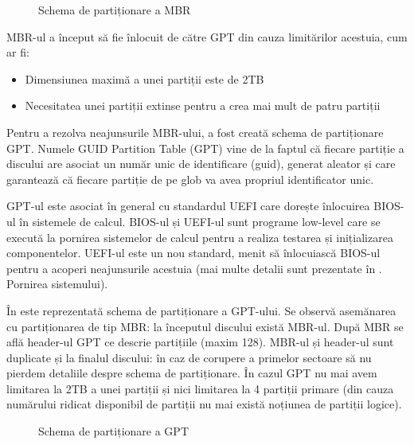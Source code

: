 \begin{figure}[htbp]
	\centering
	\def\svgwidth{\columnwidth}
	
	\caption{Schema de partiționare a MBR}
	\label{fig:storage-mbr-struct}
\end{figure}

MBR-ul a început să fie înlocuit de către GPT din cauza limitărilor acestuia,
cum ar fi:

\begin{itemize}
	\item Dimensiunea maximă a unei partiții este de 2TB
	\item Necesitatea unei partiții extinse pentru a crea mai mult de patru partiții
\end{itemize}

Pentru a rezolva neajunsurile MBR-ului, a fost creată schema de partiționare
GPT. Numele GUID Partition Table (GPT) vine de la faptul că fiecare partiție a
discului are asociat un număr unic de identificare (guid), generat aleator și
care garantează că fiecare partiție de pe glob va avea propriul identificator
unic.

GPT-ul este asociat în general cu standardul UEFI care dorește înlocuirea
BIOS-ul în sistemele de calcul. BIOS-ul și UEFI-ul sunt programe low-level care
se execută la pornirea sistemelor de calcul pentru a realiza testarea și
inițializarea componentelor. UEFI-ul este un nou standard, menit să înlocuiască
BIOS-ul pentru a acoperi neajunsurile acestuia (mai multe detalii sunt
prezentate în . Pornirea sistemului).

În  este reprezentată schema de
partiționare a GPT-ului. Se observă asemănarea cu partiționarea de tip MBR: la
începutul discului există MBR-ul.  După MBR se află header-ul GPT ce descrie
partițiile (maxim 128). MBR-ul și header-ul sunt duplicate și la finalul
discului: în caz de corupere a primelor sectoare să nu pierdem detaliile despre
schema de partiționare. În cazul GPT nu mai avem limitarea la 2TB a unei
partiții și nici limitarea la 4 partiții primare (din cauza numărului ridicat
disponibil de partiții nu mai există noțiunea de partiții logice).

\begin{figure}[htbp]
	\centering
	\def\svgwidth{\columnwidth}
	
	\caption{Schema de partiționare a GPT}
	\label{fig:storage-gpt-struct}
\end{figure}

